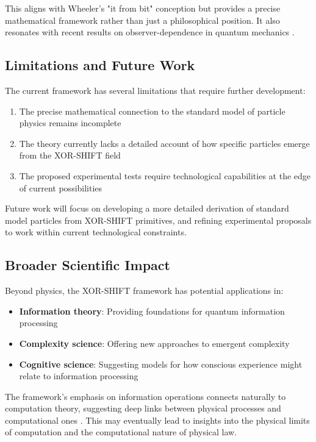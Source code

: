 This aligns with Wheeler's "it from bit" conception \cite{Wheeler1990} but provides a precise mathematical framework rather than just a philosophical position. It also resonates with recent results on observer-dependence in quantum mechanics \cite{Brukner2018}.

\subsection{Limitations and Future Work}

The current framework has several limitations that require further development:

\begin{enumerate}
    \item The precise mathematical connection to the standard model of particle physics remains incomplete
    \item The theory currently lacks a detailed account of how specific particles emerge from the XOR-SHIFT field
    \item The proposed experimental tests require technological capabilities at the edge of current possibilities
\end{enumerate}

Future work will focus on developing a more detailed derivation of standard model particles from XOR-SHIFT primitives, and refining experimental proposals to work within current technological constraints.

\subsection{Broader Scientific Impact}

Beyond physics, the XOR-SHIFT framework has potential applications in:

\begin{itemize}
    \item \textbf{Information theory}: Providing foundations for quantum information processing
    \item \textbf{Complexity science}: Offering new approaches to emergent complexity
    \item \textbf{Cognitive science}: Suggesting models for how conscious experience might relate to information processing \cite{Hardy2001}
\end{itemize}

The framework's emphasis on information operations connects naturally to computation theory, suggesting deep links between physical processes and computational ones \cite{Aaronson2005}. This may eventually lead to insights into the physical limits of computation and the computational nature of physical law.

